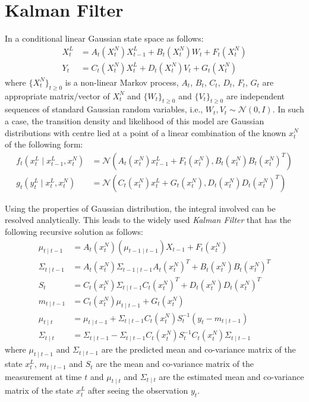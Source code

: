 \chapter{Kalman Filter}
\graphicspath{{Appendices/figures/}}
\label{sec:KF}
In a conditional linear Gaussian state space as follows:
\begin{align}
  X^L_t &= A_t(X^N_t)X^L_{t-1} + B_t(X^N_t)W_t + F_t(X^N_t) \\
  Y_t &= C_t(X^N_t)X^L_t + D_t(X^N_t)V_t + G_t(X^N_t)
\end{align}
where $\{X^N_t\}_{t \geq 0}$ is a non-linear Markov process, $A_t$, $B_t$, $C_t$, $D_t$, $F_t$, $G_t$ are appropriate matrix/vector of $X^N_t$ and  $\{W_t\}_{t \geq 0}$ and  $\{V_t\}_{t \geq 0}$ are independent sequences of standard Gaussian random variables, i.e., $W_t, V_t \sim \mathcal{N}(0,I)$. In such a case, the transition density and likelihood of this model are Gaussian distributions with centre lied at a point of a linear combination of the known $x^N_t$ of the following form:
\begin{align}
  f_t(x^L_t \mid x^L_{t-1}, x^N_t) &= \mathcal{N}(A_t(x^N_t) x^L_{t-1} + F_t(x^N_t), B_t(x^N_t)B_t(x^N_t)^T) \nonumber \\
  g_t(y^L_t \mid x^L_t, x^N_t)    &= \mathcal{N}(C_t(x^N_t) x^L_t + G_t(x^N_t), D_t(x^N_t)D_t(x^N_t)^T)
\end{align}

Using the properties of Gaussian distribution, the integral involved can be resolved analytically. This leads to the widely used \emph{Kalman Filter} \cite{KRE60} that has the following recursive solution as follows:
\begin{align}
  \mu_{t \mid t -1} &= A_{t}(x^N_t)(\mu_{t-1 \mid t-1})X_{t-1} + F_t(x^N_t) \\
  \Sigma_{t \mid t -1} &= A_{t}(x^N_t)\Sigma_{t -1 \mid t -1}A_{t}(x^N_t)^T +  B_t(x^N_t)B_t(x^N_t)^T \\
  S_t &=  C_{t}(x^N_t)\Sigma_{t \mid t -1}C_{t}(x^N_t)^T +  D_t(x^N_t)D_t(x^N_t)^T \\
  m_{t \mid t-1} &=  C_{t}(x^N_t)  \mu_{t \mid t-1} + G_t(x^N_t) \\
  \mu_{t \mid t} &=   \mu_{t \mid t-1} +   \Sigma_{t \mid t -1} C_{t}(x^N_t)S_t^{-1}(y_t - m_{t \mid t-1}) \\
  \Sigma_{t \mid t} &=  \Sigma_{t \mid t -1} -\Sigma_{t \mid t -1} C_{t}(x^N_t)S_t^{-1} C_{t}(x^N_t)\Sigma_{t \mid t -1}
\end{align}
where  $\mu_{t \mid t -1}$ and $\Sigma_{t \mid t-1}$ are the predicted mean and co-variance matrix of the state $x^L_t$, $m_{t \mid t-1}$ and $S_t$ are the mean and co-variance matrix of the measurement at time $t$ and $\mu_{t \mid t}$ and $\Sigma_{t \mid t}$ are the estimated mean and co-variance matrix of the state $x^L_t$ after seeing the observation $y_t$.

